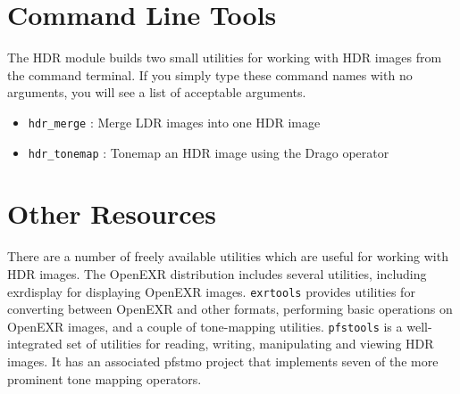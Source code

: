 



\section{Command Line Tools}

The HDR module builds two small utilities for working with HDR images
from the command terminal.  If you simply type these command names
with no arguments, you will see a list of acceptable arguments.

\begin{itemize}
\item \verb#hdr_merge#   : Merge LDR images into one HDR image
\item \verb#hdr_tonemap# : Tonemap an HDR image using the Drago operator
\end{itemize}

\section{Other Resources}
There are a number of freely available utilities which are useful for
working with HDR images. The OpenEXR distribution \cite{openexr}
includes several utilities, including exrdisplay for displaying
OpenEXR images. {\tt exrtools} \cite{exrtools} provides utilities for
converting between OpenEXR and other formats, performing basic
operations on OpenEXR images, and a couple of tone-mapping
utilities. {\tt pfstools} \cite{pfstools} is a well-integrated set of
utilities for reading, writing, manipulating and viewing HDR images.
It has an associated pfstmo project that implements seven of the more
prominent tone mapping operators.

